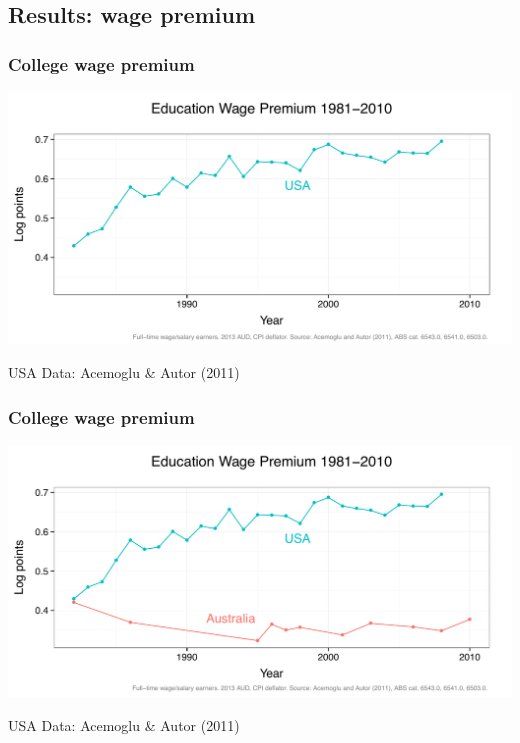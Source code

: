 \documentclass[red]{beamer}
\begin{document}
\subsection{Results: wage premium}
\begin{frame}
  \frametitle{College wage premium}
  \begin{center}
    \includegraphics[width=\textwidth]{slides_fig/ed_premium_us.pdf}
  \end{center}
  USA Data: Acemoglu \& Autor (2011)
\end{frame}

\begin{frame}
  \frametitle{College wage premium}
  \begin{center}
    \includegraphics[width=\textwidth]{slides_fig/ed_premium.pdf}
  \end{center}
  USA Data: Acemoglu \& Autor (2011)
\end{frame}
\end{document}
